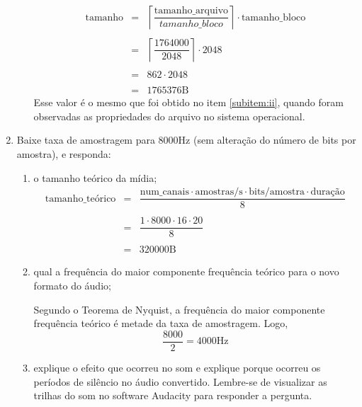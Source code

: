 \documentclass[12pt, a4paper, oneside]{abntex2}
\renewcommand{\theenumi}{\Alph*}
\renewcommand{\theenumii}{\roman*}
\begin{document}
\begin{enumerate}[ref=\theenumi]
\begin{enumerate}[ref=\theenumi.\theenumii]
                    \[
                        \begin{matrix}
                            \text{tamanho} & = & \left\lceil \dfrac{\text{tamanho\_arquivo}}{tamanho\_bloco} \right\rceil \cdot \text{tamanho\_bloco}  \\ \\
                            & = & \left\lceil \dfrac{1764000}{2048} \right\rceil \cdot 2048  \\ \\
                            & = &   862 \cdot 2048 \\ \\
                            & = &   1765376\text{B}
                        \end{matrix}
                    \]
                    Esse valor é o mesmo que foi obtido no item \ref{subitem:ii}, quando foram observadas as propriedades do arquivo no sistema operacional.

            \end{enumerate}
        \item\label{item:B} Baixe taxa de amostragem para 8000Hz (sem alteração do número de bits
            por amostra), e responda:
            \begin{enumerate}
                \item o tamanho teórico da mídia;
                    \[
                        \begin{matrix}
                            \text{tamanho\_teórico} & = & \dfrac{\text{num\_canais} \cdot \text{amostras/s} \cdot \text{bits/amostra} \cdot \text{duração}}{8} \\ \\
                            & = &   \dfrac{1 \cdot 8000 \cdot 16 \cdot 20}{8} \\ \\
                            & = &   320000\text{B}
                        \end{matrix}
                    \]

                \item qual a frequência do maior componente frequência teórico para o novo formato do áudio;

                    Segundo o Teorema de Nyquist, a frequência do maior componente frequência teórico é metade da taxa de amostragem. Logo,
                    \[
                        \dfrac{8000}{2} = 4000\text{Hz}
                    \]
                \item explique o efeito que ocorreu no som e explique porque ocorreu os períodos de silêncio no áudio convertido. Lembre-se de visualizar as trilhas do som no software Audacity para
                    responder a pergunta.


\end{enumerate}
\end{enumerate}
\end{document}
